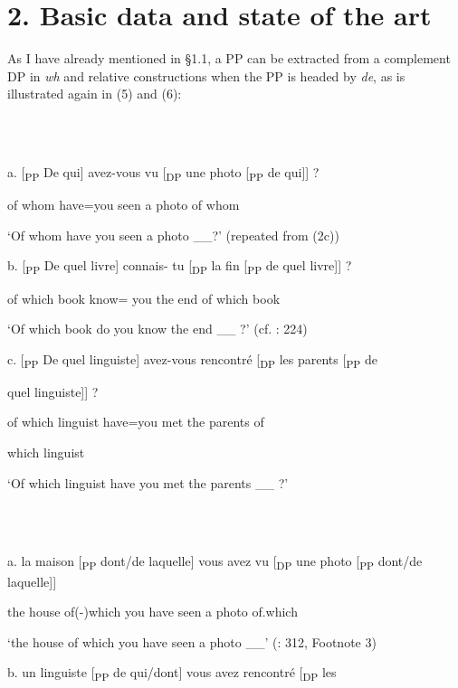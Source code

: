 \documentclass[output=paper]{langsci/langscibook}
\begin{document}
\section{ 2. Basic data and state of the art}

As I have already mentioned in §1.1, a PP can be extracted from a complement DP in \textit{wh} and relative constructions when the PP is headed by \textit{de}, as is illustrated again in (5) and (6):

\ea%
    \label{ex:key:5}
    \gll\\
        \\
    \glt
    \z

          a.  [\textsubscript{PP}  De  qui]  avez-vous vu [\textsubscript{DP}  une  photo [\textsubscript{PP}  de  qui]] ?

      of  whom  have=you seen  a  photo    of  whom 

    ‘Of whom have you seen a photo \_\_?’ (repeated from (2c))

  b.  [\textsubscript{PP}  De  quel  livre]  connais-  tu [\textsubscript{DP}  la  fin [\textsubscript{PP}  de quel livre]] ?

      of  which  book  know=  you  the   end  of which book

    ‘Of which book do you know the end \_\_ ?’ (cf. \citealt{Sportiche1981}: 224)

c.   [\textsubscript{PP}  De quel linguiste]   avez-vous  rencontré [\textsubscript{DP}  les parents [\textsubscript{PP}  de 

quel  linguiste]] ?

of which linguist  have=you  met    the parents    of

which linguist

    ‘Of which linguist have you met the parents \_\_ ?’

\ea%
    \label{ex:key:6}
    \gll\\
        \\
    \glt
    \z

          a.  la  maison  [\textsubscript{PP} dont/de laquelle]  vous avez  vu  [\textsubscript{DP}  une      photo [\textsubscript{PP} dont/de laquelle]]

    the  house    of(-)which      you have  seen    a      photo  of.which

    ‘the house of which you have seen a photo \_\_’  (\citealt{Grosu1974}: 312, Footnote 3)

  b.  un   linguiste [\textsubscript{PP}  de qui/dont]    vous  avez  rencontré [\textsubscript{DP}  les 
\end{document}
